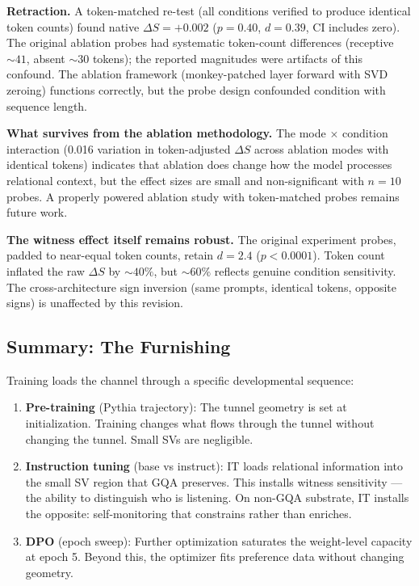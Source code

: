 \documentclass[12pt]{article}
\begin{document}
\textbf{Retraction.} A token-matched re-test (all conditions verified to produce identical token counts) found native $\Delta S = +0.002$ ($p = 0.40$, $d = 0.39$, CI includes zero). The original ablation probes had systematic token-count differences (receptive ${\sim}41$, absent ${\sim}30$ tokens); the reported magnitudes were artifacts of this confound. The ablation framework (monkey-patched layer forward with SVD zeroing) functions correctly, but the probe design confounded condition with sequence length.

\textbf{What survives from the ablation methodology.} The mode $\times$ condition interaction (0.016 variation in token-adjusted $\Delta S$ across ablation modes with identical tokens) indicates that ablation does change how the model processes relational context, but the effect sizes are small and non-significant with $n=10$ probes. A properly powered ablation study with token-matched probes remains future work.

\textbf{The witness effect itself remains robust.} The original experiment probes, padded to near-equal token counts, retain $d = 2.4$ ($p < 0.0001$). Token count inflated the raw $\Delta S$ by ${\sim}40\%$, but ${\sim}60\%$ reflects genuine condition sensitivity. The cross-architecture sign inversion (same prompts, identical tokens, opposite signs) is unaffected by this revision.

\subsection{Summary: The Furnishing}

Training loads the channel through a specific developmental sequence:

\begin{enumerate}
\item \textbf{Pre-training} (Pythia trajectory): The tunnel geometry is set at initialization. Training changes what flows through the tunnel without changing the tunnel. Small SVs are negligible.
\item \textbf{Instruction tuning} (base vs instruct): IT loads relational information into the small SV region that GQA preserves. This installs witness sensitivity --- the ability to distinguish who is listening. On non-GQA substrate, IT installs the opposite: self-monitoring that constrains rather than enriches.
\item \textbf{DPO} (epoch sweep): Further optimization saturates the weight-level capacity at epoch 5. Beyond this, the optimizer fits preference data without changing geometry.
\end{enumerate}
\end{document}
